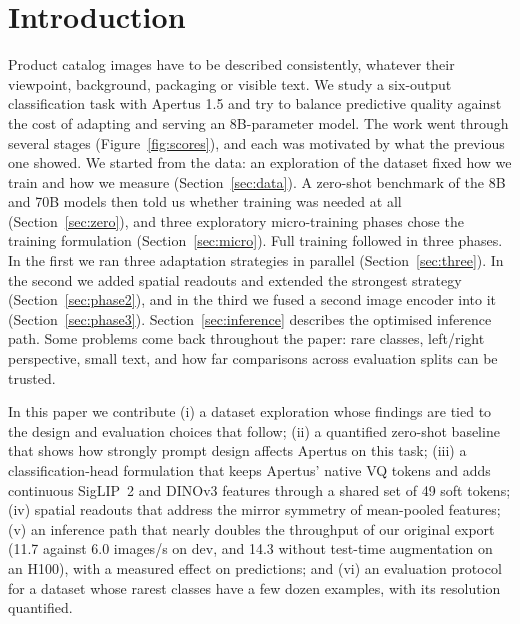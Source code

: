 \documentclass[11pt]{article}
\begin{document}
\section{Introduction}
Product catalog images have to be described consistently, whatever their viewpoint, background, packaging or visible text. We study a six-output classification task with Apertus 1.5 and try to balance predictive quality against the cost of adapting and serving an 8B-parameter model. The work went through several stages (Figure~\ref{fig:scores}), and each was motivated by what the previous one showed. We started from the data: an exploration of the dataset fixed how we train and how we measure (Section~\ref{sec:data}). A zero-shot benchmark of the 8B and 70B models then told us whether training was needed at all (Section~\ref{sec:zero}), and three exploratory micro-training phases chose the training formulation (Section~\ref{sec:micro}). Full training followed in three phases. In the first we ran three adaptation strategies in parallel (Section~\ref{sec:three}). In the second we added spatial readouts and extended the strongest strategy (Section~\ref{sec:phase2}), and in the third we fused a second image encoder into it (Section~\ref{sec:phase3}). Section~\ref{sec:inference} describes the optimised inference path. Some problems come back throughout the paper: rare classes, left/right perspective, small text, and how far comparisons across evaluation splits can be trusted.

In this paper we contribute (i) a dataset exploration whose findings are tied to the design and evaluation choices that follow; (ii) a quantified zero-shot baseline that shows how strongly prompt design affects Apertus on this task; (iii) a classification-head formulation that keeps Apertus' native VQ tokens and adds continuous SigLIP~2 and DINOv3 features through a shared set of 49 soft tokens; (iv) spatial readouts that address the mirror symmetry of mean-pooled features; (v) an inference path that nearly doubles the throughput of our original export (11.7 against 6.0 images/s on dev, and 14.3 without test-time augmentation on an H100), with a measured effect on predictions; and (vi) an evaluation protocol for a dataset whose rarest classes have a few dozen examples, with its resolution quantified.
\end{document}

